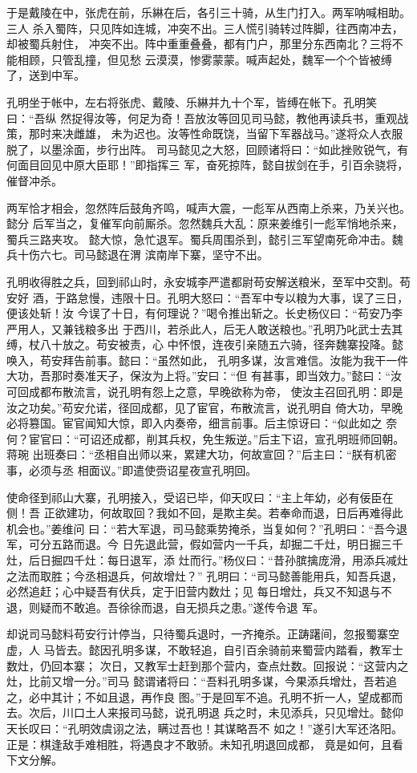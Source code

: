于是戴陵在中，张虎在前，乐綝在后，各引三十骑，从生门打入。两军呐喊相助。三人
杀入蜀阵，只见阵如连城，冲突不出。三人慌引骑转过阵脚，往西南冲去，却被蜀兵射住，
冲突不出。阵中重重叠叠，都有门户，那里分东西南北？三将不能相顾，只管乱撞，但见愁
云漠漠，惨雾蒙蒙。喊声起处，魏军一个个皆被缚了，送到中军。

孔明坐于帐中，左右将张虎、戴陵、乐綝并九十个军，皆缚在帐下。孔明笑曰：“吾纵
然捉得汝等，何足为奇！吾放汝等回见司马懿，教他再读兵书，重观战策，那时来决雌雄，
未为迟也。汝等性命既饶，当留下军器战马。”遂将众人衣服脱了，以墨涂面，步行出阵。
司马懿见之大怒，回顾诸将曰：“如此挫败锐气，有何面目回见中原大臣耶！”即指挥三
军，奋死掠阵，懿自拔剑在手，引百余骁将，催督冲杀。

两军恰才相会，忽然阵后鼓角齐鸣，喊声大震，一彪军从西南上杀来，乃关兴也。懿分
后军当之，复催军向前厮杀。忽然魏兵大乱：原来姜维引一彪军悄地杀来，蜀兵三路夹攻。
懿大惊，急忙退军。蜀兵周围杀到，懿引三军望南死命冲击。魏兵十伤六七。司马懿退在渭
滨南岸下寨，坚守不出。

孔明收得胜之兵，回到祁山时，永安城李严遣都尉苟安解送粮米，至军中交割。苟安好
酒，于路怠慢，违限十日。孔明大怒曰：“吾军中专以粮为大事，误了三日，便该处斩！汝
今误了十日，有何理说？”喝令推出斩之。长史杨仪曰：“苟安乃李严用人，又兼钱粮多出
于西川，若杀此人，后无人敢送粮也。”孔明乃叱武士去其缚，杖八十放之。苟安被责，心
中怀恨，连夜引亲随五六骑，径奔魏寨投降。懿唤入，苟安拜告前事。懿曰：“虽然如此，
孔明多谋，汝言难信。汝能为我干一件大功，吾那时奏准天子，保汝为上将。”安曰：“但
有甚事，即当效力。”懿曰：“汝可回成都布散流言，说孔明有怨上之意，早晚欲称为帝，
使汝主召回孔明：即是汝之功矣。”苟安允诺，径回成都，见了宦官，布散流言，说孔明自
倚大功，早晚必将篡国。宦官闻知大惊，即入内奏帝，细言前事。后主惊讶曰：“似此如之
奈何？宦官曰：“可诏还成都，削其兵权，免生叛逆。”后主下诏，宣孔明班师回朝。蒋琬
出班奏曰：“丞相自出师以来，累建大功，何故宣回？”后主曰：“朕有机密事，必须与丞
相面议。”即遣使赍诏星夜宣孔明回。

使命径到祁山大寨，孔明接入，受诏已毕，仰天叹曰：“主上年幼，必有佞臣在侧！吾
正欲建功，何故取回？我如不回，是欺主矣。若奉命而退，日后再难得此机会也。”姜维问
曰：“若大军退，司马懿乘势掩杀，当复如何？”孔明曰：“吾今退军，可分五路而退。今
日先退此营，假如营内一千兵，却掘二千灶，明日掘三千灶，后日掘四千灶：每日退军，添
灶而行。”杨仪曰：“昔孙膑擒庞滑，用添兵减灶之法而取胜；今丞相退兵，何故增灶？”
孔明曰：“司马懿善能用兵，知吾兵退，必然追赶；心中疑吾有伏兵，定于旧营内数灶；见
每日增灶，兵又不知退与不退，则疑而不敢追。吾徐徐而退，自无损兵之患。”遂传令退
军。

却说司马懿料苟安行计停当，只待蜀兵退时，一齐掩杀。正踌躇间，忽报蜀寨空虚，人
马皆去。懿因孔明多谋，不敢轻追，自引百余骑前来蜀营内踏看，教军士数灶，仍回本寨；
次日，又教军士赶到那个营内，查点灶数。回报说：“这营内之灶，比前又增一分。”司马
懿谓诸将曰：“吾料孔明多谋，今果添兵增灶，吾若追之，必中其计；不如且退，再作良
图。”于是回军不追。孔明不折一人，望成都而去。次后，川口土人来报司马懿，说孔明退
兵之时，未见添兵，只见增灶。懿仰天长叹曰：“孔明效虞诩之法，瞒过吾也！其谋略吾不
如之！”遂引大军还洛阳。正是：棋逢敌手难相胜，将遇良才不敢骄。未知孔明退回成都，
竟是如何，且看下文分解。